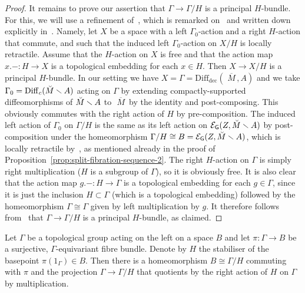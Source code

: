 \documentclass[AHL,Unicode,published]{cedram}
\newcommand{\Diff}{\mathrm{Diff}}
\newcommand{\rdec}{\mathrm{dec}}
\newcommand{\mbar}{\ensuremath{{\,\,\overline{\!\! M\!}\,}}}
\newcommand{\sG}{\mathsf{G}}
\newcommand{\cE}{\mathcal{E}}
\newcommand{\diffdec}{\ensuremath{\mathrm{Diff}_{\rdec}}}
\begin{document}
\begin{proof}
It remains to prove our assertion that $\Gamma \to \Gamma/H$ is a principal $H$-bundle. For this, we will use a refinement of~\cite[Th.~A]{Palais1960Localtrivialityof}, which is remarked on~\cite[p.~307]{Palais1960Localtrivialityof} and written down explicitly in~\cite[Prop.~4.8]{Palmer2018HomologicalstabilitymoduliI}. Namely, let $X$ be a space with a left $\Gamma_{0}$-action and a right $H$-action that commute, and such that the induced left $\Gamma_{0}$-action on $X/H$ is locally retractile. Assume that the $H$-action on $X$ is free and that the action map $x.- \colon H \to X$ is a topological embedding for each $x \in H$. Then $X \to X/H$ is a principal $H$-bundle. In our setting we have $X = \Gamma = \diffdec(\mbar,A)$ and we take $\Gamma_{0} = \Diff_c(\Breve{M} \smallsetminus A)$ acting on $\Gamma$ by extending compactly-supported diffeomorphisms of $\Breve{M} \smallsetminus A$ to $\mbar$ by the identity and post-composing. This obviously commutes with the right action of $H$ by pre-composition. The induced left action of $\Gamma_{0}$ on $\Gamma/H$ is the same as its left action on $\cE_{\sG}(Z,\Breve{M} \smallsetminus A)$ by post-composition under the homeomorphism $\Gamma/H \cong B = \cE_{\sG}(Z,\Breve{M} \smallsetminus A)$, which is locally retractile by~\cite[Prop.~4.15]{Palmer2018HomologicalstabilitymoduliI}, as mentioned already in the proof of Proposition~\ref{prop:split-fibration-sequence-2}. The right $H$-action on $\Gamma$ is simply right multiplication ($H$ is a subgroup of $\Gamma$), so it is obviously free. It is also clear that the action map $g.- \colon H \to \Gamma$ is a topological embedding for each $g \in \Gamma$, since it is just the inclusion $H \subset \Gamma$ (which is a topological embedding) followed by the homeomorphism $\Gamma \cong \Gamma$ given by left multiplication by $g$. It therefore follows from~\cite[Prop.~4.8]{Palmer2018HomologicalstabilitymoduliI} that $\Gamma \to \Gamma/H$ is a principal $H$-bundle, as claimed.
\end{proof}

\begin{lemm}\label{lem:equivariant-fibre-bundles}
Let $\Gamma$ be a topological group acting on the left on a space $B$ and let $\pi \colon \Gamma \to B$ be a surjective, $\Gamma$-equivariant fibre bundle. Denote by $H$ the stabiliser of the basepoint $\pi(1_\Gamma) \in B$. Then there is a homeomorphism $B \cong \Gamma/H$ commuting with $\pi$ and the projection $\Gamma \to \Gamma/H$ that quotients by the right action of $H$ on $\Gamma$ by multiplication.
\end{lemm}
\end{document}
